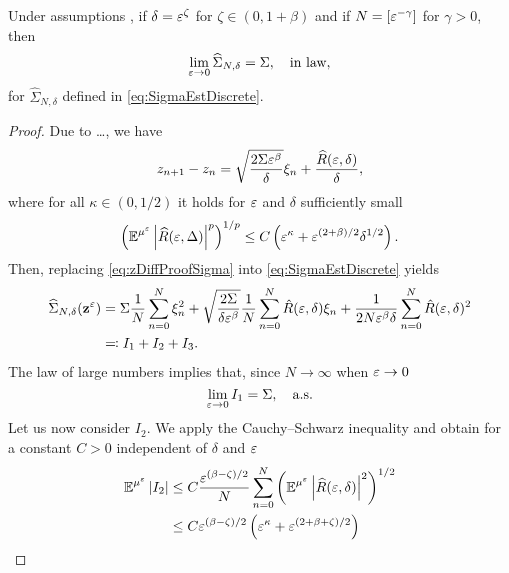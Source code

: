 \documentclass[10pt]{article}
\begin{document}
\begin{theorem}\label{thm:DiffDiscrete} Under assumptions , if $\delta = \varepsilon^\zeta$ for $\zeta \in (0, 1+\beta)$ and if $N = [\varepsilon^{-\gamma}]$ for $\gamma > 0$, then 
	\begin{equation}
	\lim_{\varepsilon \to 0} \widehat \Sigma_{N, \delta} = \Sigma, \quad \text{in law},
	\end{equation}
	for $\widehat \Sigma_{N, \delta}$ defined in \eqref{eq:SigmaEstDiscrete}.
\end{theorem}
\begin{proof} Due to \ldots, we have
	\begin{equation}\label{eq:zDiffProofSigma}
		z_{n+1} - z_n = \sqrt{\frac{2\Sigma\varepsilon^\beta}{\delta}}\xi_n + \frac{\widehat R(\varepsilon, \delta)}{\delta},
	\end{equation}
	where for all $\kappa \in (0, 1/2)$ it holds for $\varepsilon$ and $\delta$ sufficiently small
	\begin{equation}
		\left(\operatorname{\mathbb{E}}^{\mu^\varepsilon}\left\lvert\widehat R(\varepsilon, \Delta)\right\rvert^p\right)^{1/p} \leq C\left(\varepsilon^\kappa + \varepsilon^{(2+\beta)/2}\delta^{1/2}\right).
	\end{equation}
	Then, replacing \eqref{eq:zDiffProofSigma} into \eqref{eq:SigmaEstDiscrete} yields
	\begin{equation}
	\begin{aligned}
		\widehat\Sigma_{N, \delta}(\mathbf z^\varepsilon) &= \Sigma \frac1N \sum_{n=0}^N \xi_n^2 + \sqrt{\frac{2\Sigma}{\delta\varepsilon^\beta}} \frac1N \sum_{n=0}^N \hat R(\varepsilon, \delta)\xi_n
		+ \frac1{2N\varepsilon^\beta\delta}\sum_{n=0}^N\hat R(\varepsilon, \delta)^2\\
		&\eqqcolon I_1 + I_2 + I_3.
	\end{aligned}
	\end{equation}
	The law of large numbers implies that, since $N\to\infty$ when $\varepsilon \to 0$
	\begin{equation}
		\lim_{\varepsilon\to 0}I_1 = \Sigma, \quad \text{a.s.}
	\end{equation}
	Let us now consider $I_2$. We apply the Cauchy--Schwarz inequality and obtain for a constant $C > 0$ independent of $\delta$ and $\varepsilon$
	\begin{equation}
	\begin{aligned}
		\E^{\mu^\epl}\abs{I_2} &\leq C \frac{\epl^{(\beta - \zeta)/2}}{N} \sum_{n=0}^N \left(\E^{\mu^\epl} \abs{\widehat R(\epl, \delta)}^2 \right)^{1/2}\\
		&\leq C \epl^{(\beta - \zeta)/2}\left(\epl^\kappa + \epl^{(2+\beta+\zeta)/2} \right)\\

\end{aligned}
\end{equation}
\end{proof}
\end{document}
